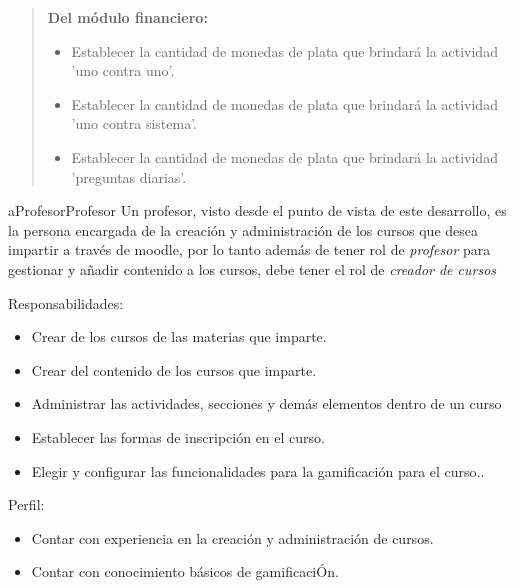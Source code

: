     \begin{quote}
    {\bf Del módulo financiero:}
        \begin{itemize}
        \item Establecer la cantidad de monedas de plata que brindará la actividad
              'uno contra uno'.
        \item Establecer la cantidad de monedas de plata que brindará la actividad
              'uno contra sistema'.
        \item Establecer la cantidad de monedas de plata que brindará la actividad
              'preguntas diarias'.
        \end{itemize}
    \end{quote}



    \begin{actor}{aProfesor}{Profesor}{%
    Un profesor, visto desde el punto de vista de este desarrollo, es la persona
    encargada de la creación y administración de los cursos que desea impartir a
    través de moodle, por lo tanto además de tener rol de {\it profesor} para
    gestionar y añadir contenido a los cursos, debe tener el rol de {\it creador de
    cursos} \cite{MoodleRoles} \\}

    \item[Responsabilidades:] \hfill
        \begin{itemize}
        \item Crear de los cursos de las materias que imparte.
        \item Crear del contenido de los cursos que imparte.
        \item Administrar las actividades, secciones y demás elementos dentro de un
              curso
        \item Establecer las formas de inscripción en el curso.
        \item Elegir y configurar las funcionalidades para la gamificación para el
              curso..
        \end{itemize}

    \item[Perfil:] \hfill
        \begin{itemize}
        \item Contar con experiencia en la creación y administración de cursos.
        \item Contar con conocimiento básicos de gamificaciÓn.
        \end{itemize}
    \end{actor}

